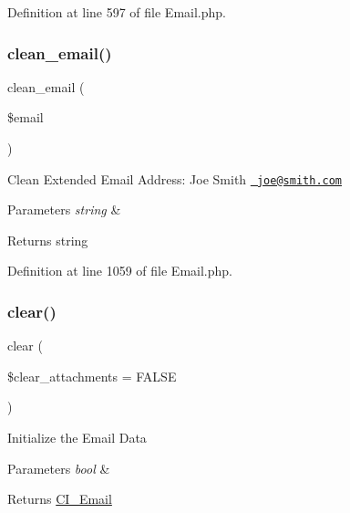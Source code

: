 Definition at line 597 of file Email.\+php.

\mbox{\label{class_c_i___email_ab8139994bc1b1bee3d2750b627cdd0c6}} 
\subsubsection{\texorpdfstring{clean\_email()}{clean\_email()}}
{\footnotesize\ttfamily clean\+\_\+email (\begin{DoxyParamCaption}\item[{}]{\$email }\end{DoxyParamCaption})}

Clean Extended Email Address\+: Joe Smith \href{mailto:joe@smith.com}{\texttt{ joe@smith.\+com}}


\begin{DoxyParams}{Parameters}
{\em string} & \\
\hline
\end{DoxyParams}
\begin{DoxyReturn}{Returns}
string 
\end{DoxyReturn}


Definition at line 1059 of file Email.\+php.

\mbox{\label{class_c_i___email_a84399b20dfff67877099743270c68538}} 
\subsubsection{\texorpdfstring{clear()}{clear()}}
{\footnotesize\ttfamily clear (\begin{DoxyParamCaption}\item[{}]{\$clear\+\_\+attachments = {\ttfamily FALSE} }\end{DoxyParamCaption})}

Initialize the Email Data


\begin{DoxyParams}{Parameters}
{\em bool} & \\
\hline
\end{DoxyParams}
\begin{DoxyReturn}{Returns}
\mbox{\hyperlink{class_c_i___email}{C\+I\+\_\+\+Email}} 
\end{DoxyReturn}


